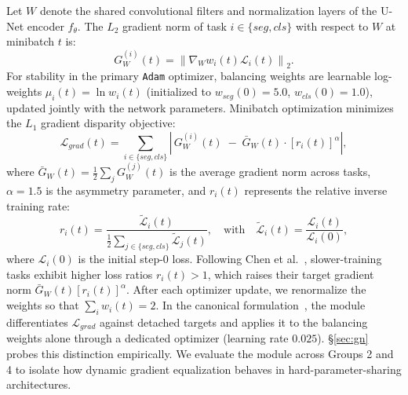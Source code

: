 \documentclass[preprint,12pt]{elsarticle}
\begin{document}
Let $W$ denote the shared convolutional filters and normalization layers of the U-Net encoder $f_\theta$. The $L_2$ gradient norm of task $i \in \{seg, cls\}$ with respect to $W$ at minibatch $t$ is:
\begin{equation}
    G_W^{(i)}(t) = \left\| \nabla_{W} w_i(t) \mathcal{L}_i(t) \right\|_2.
\end{equation}
For stability in the primary \texttt{Adam} optimizer, balancing weights are learnable log-weights $\mu_i(t) = \ln w_i(t)$ (initialized to $w_{seg}(0) = 5.0$, $w_{cls}(0) = 1.0$), updated jointly with the network parameters. Minibatch optimization minimizes the $L_1$ gradient disparity objective:
\begin{equation}
    \mathcal{L}_{grad}(t) = \sum_{i \in \{seg, cls\}} \left| \, G_W^{(i)}(t) \;-\; \bar{G}_W(t) \cdot [r_i(t)]^{\alpha} \right|,
\end{equation}
where $\bar{G}_W(t) = \frac{1}{2}\sum_j G_W^{(j)}(t)$ is the average gradient norm across tasks, $\alpha = 1.5$ is the asymmetry parameter, and $r_i(t)$ represents the relative inverse training rate:
\begin{equation}
    r_i(t) = \frac{\tilde{\mathcal{L}}_i(t)}{\frac{1}{2}\sum_{j \in \{seg, cls\}} \tilde{\mathcal{L}}_j(t)}, \quad \text{with} \quad \tilde{\mathcal{L}}_i(t) = \frac{\mathcal{L}_i(t)}{\mathcal{L}_i(0)},
\end{equation}
where $\mathcal{L}_i(0)$ is the initial step-0 loss. Following Chen et al.~\cite{chen2018gradnorm}, slower-training tasks exhibit higher loss ratios $r_i(t) > 1$, which raises their target gradient norm $\bar{G}_W(t) [r_i(t)]^\alpha$. After each optimizer update, we renormalize the weights so that $\sum_i w_i(t) = 2$. In the canonical formulation~\cite{chen2018gradnorm}, the module differentiates $\mathcal{L}_{grad}$ against detached targets and applies it to the balancing weights alone through a dedicated optimizer (learning rate $0.025$). \S\ref{sec:gn} probes this distinction empirically. We evaluate the module across Groups 2 and 4 to isolate how dynamic gradient equalization behaves in hard-parameter-sharing architectures.
\end{document}
